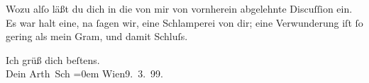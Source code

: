 \pstart
           Wozu alſo läßt du dich in die von mir von vornherein abgelehnte Discuſſion ein. Es
               war halt eine, na{ }ſagen wir, eine Schlamperei von {\pb}dir; eine Verwunderung iſt{ }ſo gering als mein Gram, und damit Schluſs.\pend
           
\pstart
           Ich grüß dich beſtens.{\\[\baselineskip]}Dein \spacefill\mbox{Arth Sch}\pend
           \leftskip=0em{}
\pstart
           Wien9. 3. 99.\pend
           \endnumbering{}  \newcommand{\dateiname}{L00903}\newcommand{\titel}{Arthur Schnitzler an Hermann Bahr, 9. 3. 1899}\newcommand{\editorInnen}{Herausgegeben von Martin Anton Müller}
